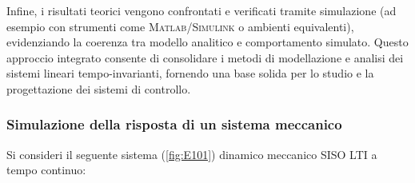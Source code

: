\documentclass[../main.tex]{subfiles}
\begin{document}
Infine, i risultati teorici vengono confrontati e verificati tramite simulazione (ad esempio con strumenti come \textsc{Matlab}/\textsc{Simulink} o ambienti equivalenti), evidenziando la coerenza tra modello analitico e comportamento simulato. Questo approccio integrato consente di consolidare i metodi di modellazione e analisi dei sistemi lineari tempo-invarianti, fornendo una base solida per lo studio e la progettazione dei sistemi di controllo.


\vspace*{1cm}
\subsubsection{Simulazione della risposta di un sistema meccanico}
\label{sim1}

Si consideri il seguente sistema (\autoref{fig:E101}) dinamico meccanico SISO LTI a tempo continuo:
\end{document}
